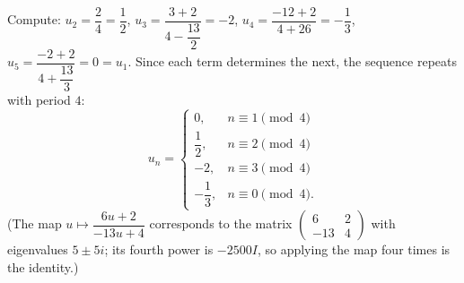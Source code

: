 Compute: $u_2=\dfrac{2}{4}=\dfrac{1}{2}$, $u_3=\dfrac{3+2}{4-\dfrac{13}{2}}=-2$, $u_4=\dfrac{-12+2}{4+26}=-\dfrac{1}{3}$, $u_5=\dfrac{-2+2}{4+\dfrac{13}{3}}=0=u_1$. Since each term determines the next, the sequence repeats with period $4$:
\[
u_n=\begin{cases}0,&n\equiv1\pmod4\\[2pt]\dfrac{1}{2},&n\equiv2\pmod4\\[2pt]-2,&n\equiv3\pmod4\\[2pt]-\dfrac{1}{3},&n\equiv0\pmod4.\end{cases}
\]
(The map $u\mapsto\dfrac{6u+2}{-13u+4}$ corresponds to the matrix $\begin{pmatrix}6&2\\-13&4\end{pmatrix}$ with eigenvalues $5\pm5i$; its fourth power is $-2500I$, so applying the map four times is the identity.)
